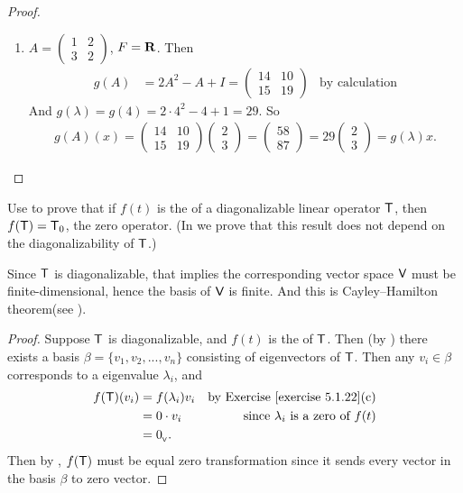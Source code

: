 \begin{proof}
\begin{enumerate}
\item
\(A = \begin{pmatrix} 1 & 2 \\ 3 & 2 \end{pmatrix}\), \(F = \mathbf{R}\).
Then
\begin{align*}
    g(A) & = 2A^2 - A + I = \begin{pmatrix} 14 & 10 \\ 15 & 19 \end{pmatrix} & \text{by calculation}
\end{align*}
And \(g(\lambda) = g(4) = 2 \cdot 4^2 - 4 + 1 = 29\).
So
\begin{align*}
    g(A)(x) = \begin{pmatrix} 14 & 10 \\ 15 & 19 \end{pmatrix}
    \begin{pmatrix} 2 \\ 3 \end{pmatrix}
    = \begin{pmatrix} 58 \\ 87 \end{pmatrix}
    = 29 \begin{pmatrix} 2 \\ 3 \end{pmatrix}
    = g(\lambda) x.
\end{align*}
\end{enumerate}
\end{proof}

\begin{exercise} \label{exercise 5.1.23}
Use  to prove that if \(f(t)\) is the \CPOLY{} of a diagonalizable linear operator \(\textsf{T}\), then \(f(\textsf{T}) = \textsf{T}_0\), the zero operator.
(In  we prove that this result does not depend on the diagonalizability of \(\textsf{T}\).)
\end{exercise}

\begin{note}
Since \(\textsf{T}\) is diagonalizable, that implies the corresponding vector space \(\textsf{V}\) must be finite-dimensional, hence the basis of \(\textsf{V}\) is finite.
And this is Cayley–Hamilton theorem(see ).
\end{note}

\begin{proof}
Suppose \(\textsf{T}\) is diagonalizable, and \(f(t)\) is the \CPOLY{} of \(\textsf{T}\).
Then (by ) there exists a basis \(\beta = \{ v_1, v_2, ..., v_n \}\) consisting of eigenvectors of \(\textsf{T}\).
Then any \(v_i \in \beta\) corresponds to a eigenvalue \(\lambda_i\), and
\begin{align*}
    f(\T)(v_i) & = f(\lambda_i) v_i & \text{by \EXEC{5.1.22}(c)} \\
               & = 0 \cdot v_i & \text{since \(\lambda_i\) is a zero of \(f(t)\)} \\
               & = \OV.
\end{align*}
Then by , \(f(\textsf{T})\) must be equal zero transformation since it sends every vector in the basis \(\beta\) to zero vector.
\end{proof}

